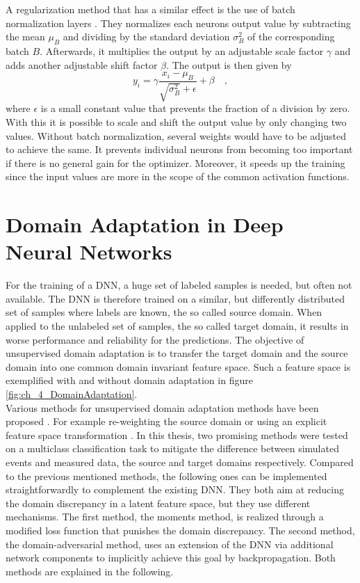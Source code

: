 A regularization method that has a similar effect is the use of batch normalization layers \cite{BatchNormalization}. They normalizes each neurons output value by subtracting the mean $\mu_B$ and dividing by the standard deviation $\sigma_B^2$ of the corresponding batch $B$. Afterwards, it multiplies the output by an adjustable scale factor $\gamma$ and adds another adjustable shift factor $\beta$. The output is then given by
\begin{equation}
y_i = \gamma \frac{x_i - \mu_B}{\sqrt{\sigma_B^2} + \epsilon} + \beta \quad ,
\end{equation}
where $\epsilon$ is a small constant value that prevents the fraction of a division by zero. With this it is possible to scale and shift the output value by only changing two values. Without batch normalization, several weights would have to be adjusted to achieve the same. It prevents individual neurons from becoming too important if there is no general gain for the optimizer. Moreover, it speeds up the training since the input values are more in the scope of the common activation functions. 


\section{Domain Adaptation in Deep Neural Networks}\label{sec:ch_4_da}
For the training of a DNN, a huge set of labeled samples is needed, but often not available. The DNN is therefore trained on a similar, but differently distributed set of samples where labels are known, the so called source domain. When applied to the unlabeled set of samples, the so called target domain, it results in worse performance and reliability for the predictions. The objective of unsupervised domain adaptation is to transfer the target domain and the source domain into one common domain invariant feature space. Such a feature space is exemplified with and without domain adaptation in figure \ref{fig:ch_4_DomainAdaptation}.\\

Various methods for unsupervised domain adaptation methods have been proposed \cite{ADDA}. For example re-weighting the source domain \cite{Reweighting} or using an explicit feature space transformation \cite{TCA}. In this thesis, two promising methods were tested on a multiclass classification task to mitigate the difference between simulated events and measured data, the source and target domains respectively. Compared to the previous mentioned methods, the following ones can be implemented straightforwardly to complement the existing DNN. They both aim at reducing the domain discrepancy in a latent feature space, but they use different mechanisms. The first method, the moments method, is realized through a modified loss function that punishes the domain discrepancy. The second method, the domain-adversarial method, uses an extension of the DNN via additional network components to implicitly achieve this goal by backpropagation. Both methods are explained in the following.\\

